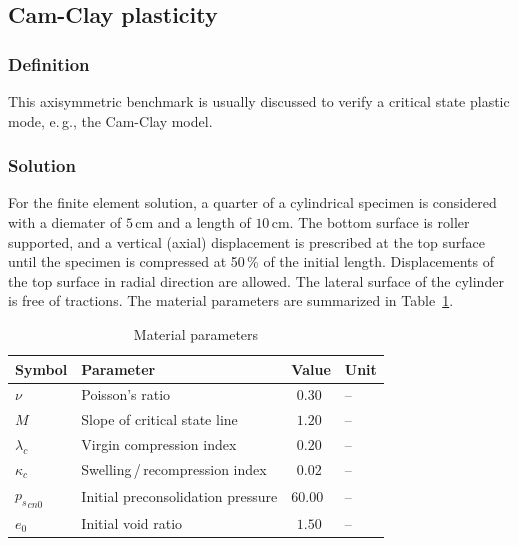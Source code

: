 \subsection{Cam-Clay plasticity}
\label{subsec:Mp3}

\subsubsection{Definition}
\label{subsubsec:Mp3_def}

This axisymmetric benchmark is usually discussed to verify a critical state plastic mode, e.\,g., the Cam-Clay model. 

\subsubsection{Solution}
\label{subsubsec:Mp3_sol}

For the finite element solution, a quarter of a cylindrical specimen is considered with a diemater of $5\,$cm and a length of $10\,$cm. The bottom surface is roller supported, and a vertical (axial) displacement is prescribed at the top surface until the specimen is compressed at 50\,\% of the initial length. Displacements of the top surface in radial direction are allowed. The lateral surface of the cylinder is free of tractions. The material parameters are summarized in Table~\ref{Mp_tab:m_cc_s}.

\begin{table}[!htb]
\centering
\caption{Material parameters}
\label{Mp_tab:m_cc_s}
\begin{tabular}{llll}
\toprule
Symbol & Parameter & Value & Unit \\
\midrule
$\nu$       & Poisson's ratio                   & $\ \,0.30$ & -- \\
$M$         & Slope of critical state line      & $\ \,1.20$ & -- \\
$\lambda_c$ & Virgin compression index          & $\ \,0.20$ & -- \\
$\kappa_c$  & Swelling\,/\,recompression index  & $\ \,0.02$ & -- \\
${p_s}_{cn0}$ & Initial preconsolidation pressure & $60.00$    & -- \\
$e_0$       & Initial void ratio                & $\ \,1.50$ & -- \\
\bottomrule
\end{tabular}
\end{table}

